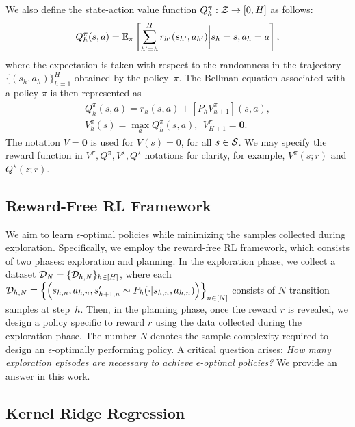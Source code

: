 We also define the state-action value function $Q^{\pi}_h:\mathcal{Z}\rightarrow [0,H]$ as follows:
\begin{equation}
Q_h^{\pi}(s,a) = \mathbb{E}_{\pi}\left[
\sum_{h'=h}^Hr_{h'}(s_{h'},a_{h'})\bigg|s_h=s, a_h=a
\right],
\end{equation}
where the expectation is taken with respect to the randomness in the trajectory $\{(s_h,a_h)\}_{h=1}^H$ obtained by the policy~$\pi$.
The Bellman equation associated with a policy $\pi$ is then represented as
\begin{align*}
Q_h^{\pi}(s,a) = r_h(s,a) + [P_hV^{\pi}_{h+1}](s,a), \\
V_h^{\pi}(s) = \max_{a}Q_h^{\pi}(s,a),~~
V_{H+1}^{\pi} = \bm{0}.
\end{align*}
The notation $V=\bm{0}$ is used for $V(s)=0$, for all $s\in\mathcal{S}$.
We may specify the reward function in $V^{\pi}, Q^{\pi}, V^{\star}, Q^{\star}$ notations for clarity, for example, $V^{\pi}(s;r)$ and $Q^{\star}(z;r)$. 



\subsection{Reward-Free RL Framework}

We aim to learn $\epsilon$-optimal policies while minimizing the samples collected during exploration.
Specifically, we employ the reward-free RL framework, which consists of two phases: {exploration} and {planning}. In the exploration phase, we collect
a dataset $\mathcal{D}_{N}=\{\mathcal{D}_{h,N}\}_{h\in[H]}$, where each $\mathcal{D}_{h,N}=\left\{\left(s_{h,n}, a_{h,n}, s'_{h+1,n}\sim P_h(\cdot|s_{h,n},a_{h,n})\right)\right\}_{n\in[N]}$ consists of $N$ transition samples at step~$h$. Then, in the planning phase, once the reward $r$ is revealed, we design a policy specific to reward $r$ using the data collected during the exploration phase. The number $N$ denotes the sample complexity required to design an $\epsilon$-optimally performing policy. A critical question arises: \emph{How many exploration episodes are necessary to achieve $\epsilon$-optimal policies?} We provide an answer in this work. 

\subsection{Kernel Ridge Regression}

